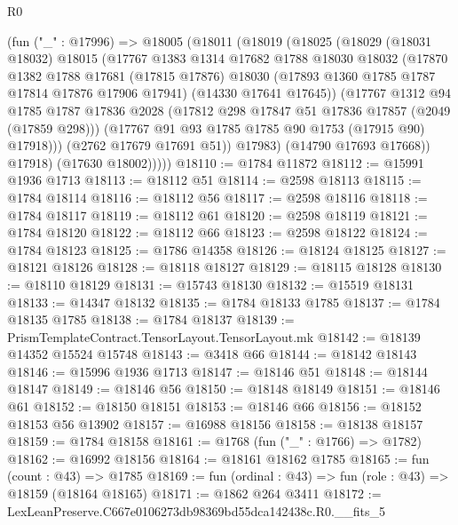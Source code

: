 \begin{lexlean}{R0}
\begin{coremodule}
          (fun ("_" : @17996) =>
          @18005
            (@18011
              (@18019
                (@18025
                  (@18029
                    (@18031 @18032)
                    @18015
                    (@17767
                      @1383
                      @1314
                      @17682
                      @1788
                      @18030
                      @18032
                      (@17870
                        @1382
                        @1788
                        @17681
                        (@17815 @17876)
                        @18030
                        (@17893 @1360 @1785 @1787 @17814 @17876 @17906 @17941)
                        (@14330 @17641 @17645))
                      (@17767
                        @1312
                        @94
                        @1785
                        @1787
                        @17836
                        @2028
                        (@17812 @298 @17847 @51 @17836 @17857 (@2049 (@17859 @298)))
                        (@17767 @91 @93 @1785 @1785 @90 @1753 (@17915 @90) @17918)))
                    (@2762 @17679 @17691 @51))
                  @17983)
                (@14790 @17693 @17668))
              @17918)
            (@17630 @18002)))))
@18110 := @1784 @11872
@18112 := @15991 @1936 @1713
@18113 := @18112 @51
@18114 := @2598 @18113
@18115 := @1784 @18114
@18116 := @18112 @56
@18117 := @2598 @18116
@18118 := @1784 @18117
@18119 := @18112 @61
@18120 := @2598 @18119
@18121 := @1784 @18120
@18122 := @18112 @66
@18123 := @2598 @18122
@18124 := @1784 @18123
@18125 := @1786 @14358
@18126 := @18124 @18125
@18127 := @18121 @18126
@18128 := @18118 @18127
@18129 := @18115 @18128
@18130 := @18110 @18129
@18131 := @15743 @18130
@18132 := @15519 @18131
@18133 := @14347 @18132
@18135 := @1784 @18133 @1785
@18137 := @1784 @18135 @1785
@18138 := @1784 @18137
@18139 := PrismTemplateContract.TensorLayout.TensorLayout.mk
@18142 := @18139 @14352 @15524 @15748
@18143 := @3418 @66
@18144 := @18142 @18143
@18146 := @15996 @1936 @1713
@18147 := @18146 @51
@18148 := @18144 @18147
@18149 := @18146 @56
@18150 := @18148 @18149
@18151 := @18146 @61
@18152 := @18150 @18151
@18153 := @18146 @66
@18156 := @18152 @18153 @56 @13902
@18157 := @16988 @18156
@18158 := @18138 @18157
@18159 := @1784 @18158
@18161 := @1768 (fun ("_" : @1766) => @1782)
@18162 := @16992 @18156
@18164 := @18161 @18162 @1785
@18165 := fun (count : @43) => @1785
@18169 := fun (ordinal : @43) => fun (role : @43) => @18159 (@18164 @18165)
@18171 := @1862 @264 @3411
@18172 := LexLeanPreserve.C667e0106273db98369bd55dca142438c.R0.__fits_5

\end{coremodule}
\end{lexlean}
